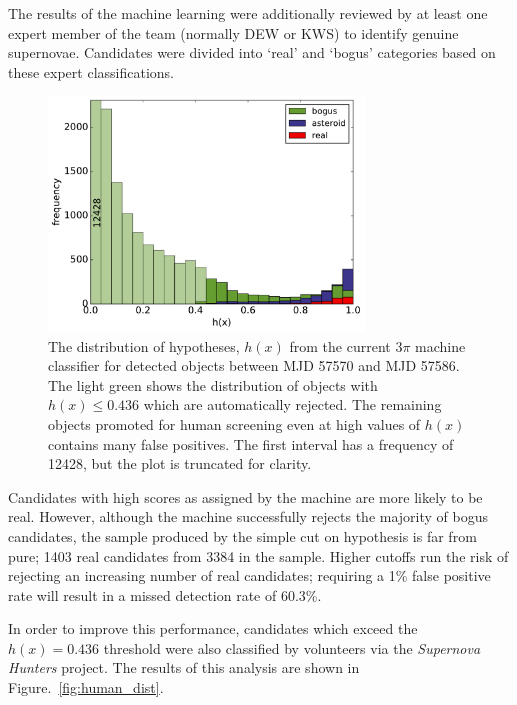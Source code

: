 \message{ !name(blank.tex)}\documentclass[a4paper,fleqn,usenatbib]{mnras}
\begin{document}
The results of the machine learning were additionally reviewed by at least one expert member of the team (normally DEW or KWS) to identify genuine supernovae. Candidates were divided into `real' and `bogus' categories based on these expert classifications.

\begin{figure}
   \includegraphics[width=84mm]{figs/machine_hist.pdf}
   \caption{The distribution of hypotheses, $h(x)$ from the current 3$\pi$ machine classifier 
            for detected objects between MJD 57570 and MJD 57586.  The light green shows the distribution of 
            objects with $h(x) \leq 0.436$ which are automatically rejected.  The remaining 
            objects promoted for human screening even at high values of $h(x)$ contains
            many false positives.  The first interval has a frequency of 12428, but the plot is truncated for clarity.} 
   \label{fig:machine_dist} 
\end{figure}

Candidates with high scores as assigned by the machine are more likely to be real. However, although the machine successfully rejects the majority of bogus candidates, the sample produced by the simple cut on hypothesis is far from pure; 1403 real candidates from 3384 in the sample. Higher cutoffs run the risk of rejecting an increasing number of real candidates; requiring a 1\% false positive rate will result in a missed detection rate of 60.3\%. 

In order to improve this performance, candidates which exceed the $h(x) = 0.436$ threshold were also classified by volunteers via the \emph{Supernova Hunters} project. The results of this analysis are shown in Figure.~\ref{fig:human_dist}. 
\end{document}
